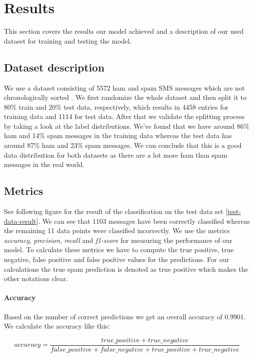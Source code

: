 \section{Results}
This section covers the results our model achieved and a description of our used dataset for training and testing the model.

\subsection{Dataset description}
We use a dataset consisting of 5572 ham and spam SMS messages which are not chronologically sorted \cite{dataset}. We first randomize the whole dataset and then split it to 80\% train and 20\% test data, respectively, which results in 4458 entries for training data and 1114 for test data. After that we validate the splitting process by taking a look at the label distributions. We've found that we have around 86\% ham and 14\% spam messages in the training data whereas the test data has around 87\% ham and 23\% spam messages. We can conclude that this is a good data distribution for both datasets as there are a lot more ham than spam messages in the real world.

\subsection{Metrics}
See following figure for the result of the classification on the test data set \ref{test-data-result}. We can see that 1103 messages have been correctly classified whereas the remaining 11 data points were classified incorrectly. We use the metrics \textit{accuracy}, \textit{precision}, \textit{recall} and \textit{f1-score} for measuring the performance of our model. To calculate these metrics we have to compute the true positive, true negative, false positive and false positive values for the predictions. For our calculations the true spam prediction is denoted as true positive which makes the other notations clear.

\paragraph{Accuracy}
Based on the number of correct predictions we get an overall accuracy of $0.9901$. We calculate the accuracy like this:

$$accuracy = \frac{true\_positive + true\_negative}{false\_positive + false\_negative + true\_positive + true\_negative}$$

